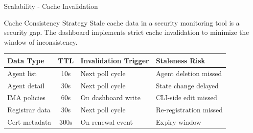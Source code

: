 \begin{frame}{Scalability - Cache Invalidation}
  \begin{block}{Cache Consistency Strategy}
    \scriptsize
    Stale cache data in a security monitoring tool is a security gap. The dashboard
    implements strict cache invalidation to minimize the window of inconsistency.
  \end{block}

  \vspace{0.1cm}

  \scriptsize
  \begin{center}
    \begin{tabular}{|l|c|l|l|}
      \hline
      \textbf{Data Type} & \textbf{TTL} & \textbf{Invalidation Trigger} & \textbf{Staleness Risk} \\
      \hline
      \hline
      Agent list & 10s & Next poll cycle & Agent deletion missed \\
      \hline
      Agent detail & 30s & Next poll cycle & State change delayed \\
      \hline
      IMA policies & 60s & On dashboard write & CLI-side edit missed \\
      \hline
      Registrar data & 30s & Next poll cycle & Re-registration missed \\
      \hline
      Cert metadata & 300s & On renewal event & Expiry window \\
      \hline
    \end{tabular}
  \end{center}

  \vspace{0.1cm}


\end{frame}

